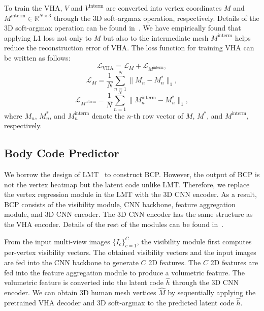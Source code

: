 \documentclass{article}
\begin{document}
To train the VHA, $V$ and $V^{\text{interm}}$ are converted into vertex coordinates $M$ and $M^{\text{interm}}\in{}\mathbb{R}^{N\times{}3}$ through the 3D soft-argmax operation, respectively. Details of the 3D soft-argmax operation can be found in~\cite{2018_Sun, 2019_LT, Chun_2023_WACV}. We have empirically found that applying L1 loss not only to $M$ but also to the intermediate mesh $M^{\text{interm}}$ helps reduce the reconstruction error of VHA. The loss function for training VHA can be written as follows:
\begin{equation}
\label{eq:vha_loss_all}
    \mathcal{L}_{\text{VHA}}=\mathcal{L}_{M}+\mathcal{L}_{M^{\text{interm}}},
\end{equation}
\begin{equation}
\label{eq:vha_loss}
    \mathcal{L}_{M}=\frac{1}{N}\sum_{n=1}^{N}\|M_{n}-M_{n}^{*}\|_{1},
\end{equation}
\begin{equation}
\label{eq:vha_loss_intermediate}
    \mathcal{L}_{M^{\text{interm}}}=\frac{1}{N}\sum_{n=1}^{N}\|M_{n}^{\text{interm}}-M_{n}^{*}\|_{1},
\end{equation}
where $M_n$, $M^{*}_n$, and $M^{\text{interm}}_n$ denote the $n$-th row vector of $M$, $M^{*}$, and $M^{\text{interm}}$, respectively.




\subsection{Body Code Predictor}
\label{ssec:bcp}

We borrow the design of LMT~\cite{Chun_2023_WACV} to construct BCP. However, the output of BCP is not the vertex heatmap but the latent code unlike LMT. Therefore, we replace the vertex regression module in the LMT with the 3D CNN encoder. As a result, BCP consists of the visibility module, CNN backbone, feature aggregation module, and 3D CNN encoder. The 3D CNN encoder has the same structure as the VHA encoder. Details of the rest of the modules can be found in~\cite{Chun_2023_WACV}. 

From the input multi-view images $\{I_c\}_{c=1}^{C}$, the visibility module first computes per-vertex visibility vectors. The obtained visibility vectors and the input images are fed into the CNN backbone to generate $C$ 2D features. The $C$ 2D features are fed into the feature aggregation module to produce a volumetric feature. The volumetric feature is converted into the latent code $\hat{h}$ through the 3D CNN encoder. We can obtain 3D human mesh vertices $\hat{M}$ by sequentially applying the pretrained VHA decoder and 3D soft-argmax to the predicted latent code $\hat{h}$.
\end{document}
